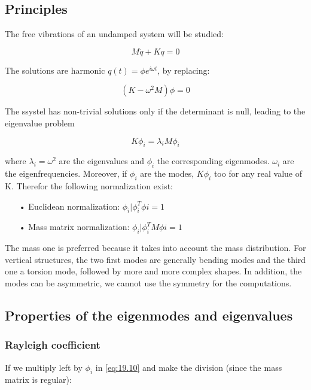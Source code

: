 \subsection{Principles}
	The free vibrations of an undamped system will be studied: 
	
	\begin{equation}
	M\ddot{q} + K q = 0
	\end{equation}
	
	The solutions are harmonic $q(t) = \phi e^{i\omega t}$, by replacing: 
	
	\begin{equation}
	(K - \omega ^2 M) \phi = 0
	\end{equation}
	
	The ssystel has non-trivial solutions only if the determinant is null, leading to the eigenvalue problem 
	
	\begin{equation}
	K \phi _i = \lambda _i M\phi _i
	\label{eq:19.10}
	\end{equation}
	
	where $\lambda _i = \omega ^2$ are the eigenvalues and $\phi _i$ the corresponding eigenmodes. $\omega _i$ are the eigenfrequencies. Moreover, if $\phi _i$ are the modes, $K\phi _i$ too for any real value of K. Therefor the following normalization exist: \\
	
	\begin{itemize}
	\item[•] Euclidean normalization: $\phi _i | \phi _i^T \phi i = 1$
	\item[•] Mass matrix normalization: $\phi _i | \phi _i^T M\phi i = 1$\\
\end{itemize}	  

	The mass one is preferred because it takes into account the mass distribution. For vertical structures, the two first modes are generally bending modes and the third one a torsion mode, followed by more and more complex shapes. In addition, the modes can be asymmetric, we cannot use the symmetry for the computations. 
	
\subsection{Properties of the eigenmodes and eigenvalues}
\subsubsection{Rayleigh coefficient}
	If we multiply left by $\phi _i$ in \eqref{eq:19.10} and make the division (since the mass matrix is regular): 
	
